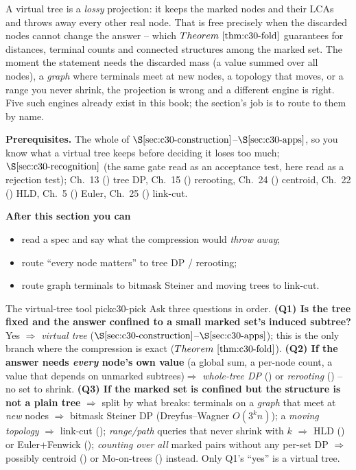 \begin{topicintro}
A virtual tree is a \emph{lossy} projection: it keeps the marked nodes and their LCAs and
throws away every other real node.  That is free precisely when the discarded nodes
cannot change the answer -- which \(\thmref{c30-fold}\) guarantees for distances,
terminal counts and connected structures among the marked set.  The moment the
statement needs the discarded mass (a value summed over all nodes), a \emph{graph} where
terminals meet at new nodes, a topology that moves, or a range you never shrink, the
projection is wrong and a different engine is right.  Five such engines already exist in
this book; the section's job is to route to them by name.

\textbf{Prerequisites.} The whole of \(\secref{c30-construction}\)--\(\secref{c30-apps}\),
so you know what a virtual tree keeps before deciding it loses too much;
\(\secref{c30-recognition}\) (the same gate read as an acceptance test, here read as a
rejection test); Ch.~13 () tree DP, Ch.~15 () rerooting, Ch.~24
() centroid, Ch.~22 () HLD, Ch.~5 () Euler, Ch.~25
() link-cut.

\textbf{After this section you can}
\begin{itemize}[nosep]
  \item read a spec and say what the compression would \emph{throw away}; \hfill{}
  \item route ``every node matters'' to tree DP / rerooting; \hfill{}
  \item route graph terminals to bitmask Steiner and moving trees to link-cut. \hfill{}
\end{itemize}
\end{topicintro}

\begin{definition}{The virtual-tree tool pick}{c30-pick}
Ask three questions in order. \textbf{(Q1) Is the tree fixed and the answer confined to a
small marked set's induced subtree?} Yes \(\Rightarrow\) \emph{virtual tree}
(\(\secref{c30-construction}\)--\(\secref{c30-apps}\)); this is the only branch where the
compression is exact (\(\thmref{c30-fold}\)). \textbf{(Q2) If the answer needs \emph{every}
node's own value} (a global sum, a per-node count, a value that depends on unmarked
subtrees)\(\Rightarrow\) \emph{whole-tree DP} () or \emph{rerooting}
() -- no set to shrink. \textbf{(Q3) If the marked set is confined but the
structure is not a plain tree} \(\Rightarrow\) split by what breaks: terminals on a
\emph{graph} that meet at \emph{new} nodes \(\Rightarrow\) bitmask Steiner DP
(Dreyfus--Wagner \(O(3^k n)\)); a \emph{moving topology} \(\Rightarrow\) link-cut
(); \emph{range/path} queries that never shrink with \(k\) \(\Rightarrow\) HLD
() or Euler+Fenwick (); \emph{counting over all} marked pairs
without any per-set DP \(\Rightarrow\) possibly centroid () or Mo-on-trees
() instead.  Only Q1's ``yes'' is a virtual tree.
\end{definition}

